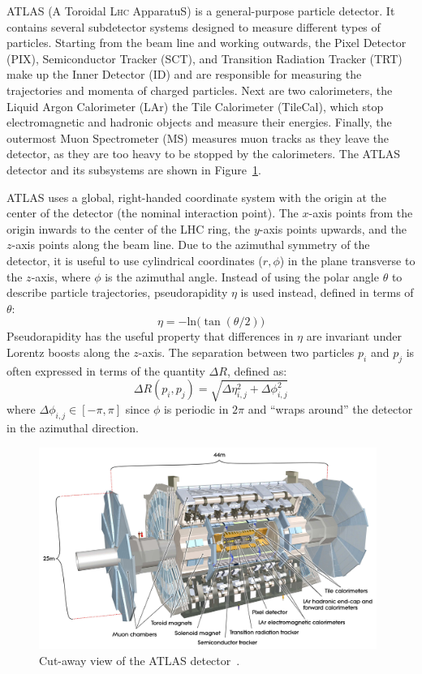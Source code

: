 ﻿ATLAS (A Toroidal L{\scshape hc} ApparatuS) is a general-purpose particle detector.
It contains several subdetector systems designed to measure different types of particles.
Starting from the beam line and working outwards, the Pixel Detector (PIX), Semiconductor Tracker (SCT), and Transition Radiation Tracker (TRT) make up the Inner Detector (ID) and are responsible for measuring the trajectories and momenta of charged particles.
Next are two calorimeters, the Liquid Argon Calorimeter (LAr) the Tile Calorimeter (TileCal), which stop electromagnetic and hadronic objects and measure their energies.
Finally, the outermost Muon Spectrometer (MS) measures muon tracks as they leave the detector, as they are too heavy to be stopped by the calorimeters.
The ATLAS detector and its subsystems are shown in Figure~\ref{fig:atlas}.

ATLAS uses a global, right-handed coordinate system with the origin at the center of the detector (the nominal interaction point).
The $x$-axis points from the origin inwards to the center of the LHC ring, the $y$-axis points upwards, and the $z$-axis points along the beam line.
Due to the azimuthal symmetry of the detector, it is useful to use cylindrical coordinates ($r,\phi$) in the plane transverse to the $z$-axis, where $\phi$ is the azimuthal angle.
Instead of using the polar angle $\theta$ to describe particle trajectories, pseudorapidity $\eta$ is used instead, defined in terms of $\theta$:
\begin{equation}
  \eta = -\mathrm{ln}\big(\tan(\theta/2)\big)
  \label{eq:eta}
\end{equation}
Pseudorapidity has the useful property that differences in $\eta$ are invariant under Lorentz boosts along the $z$-axis.
The separation between two particles $p_i$ and $p_j$ is often expressed in terms of the quantity $\Delta R$, defined as:
\begin{equation}
  \Delta R(p_i,p_j) = \sqrt{\Delta\eta_{i,j}^2 + \Delta\phi_{i,j}^2}
  \label{eq:deltar}
\end{equation}
where $\Delta\phi_{i,j} \in [-\pi,\pi]$ since $\phi$ is periodic in $2\pi$ and ``wraps around'' the detector in the azimuthal direction.

\begin{figure}[tbp]
  \begin{center}
    \includegraphics[width=0.98\textwidth]{figs/detector/atlas.pdf}
  \end{center}
  \caption[Cut-away view of the ATLAS detector.]{Cut-away view of the ATLAS detector~\cite{PERF-2007-01}.}
  \label{fig:atlas}
\end{figure}
